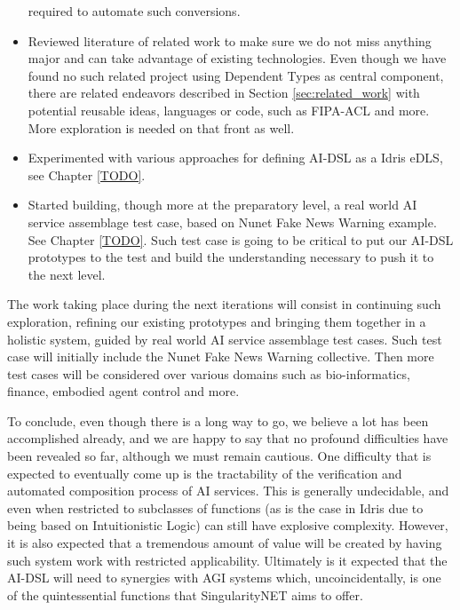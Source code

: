 \documentclass[]{report}
\begin{document}
\begin{itemize}
  required to automate such conversions.
\item Reviewed literature of related work to make sure we do not miss
  anything major and can take advantage of existing technologies.
  Even though we have found no such related project using Dependent
  Types as central component, there are related endeavors described in Section
  \ref{sec:related_work} with potential reusable ideas, languages or code,
  such as FIPA-ACL and more.  More exploration is needed on that front
  as well.
\item Experimented with various approaches for defining AI-DSL as a
  Idris eDLS, see Chapter \ref{TODO}.
\item Started building, though more at the preparatory level, a real
  world AI service assemblage test case, based on Nunet Fake News
  Warning example.  See Chapter \ref{TODO}.  Such test case is going
  to be critical to put our AI-DSL prototypes to the test and build
  the understanding necessary to push it to the next level.
\end{itemize}
The work taking place during the next iterations will consist in
continuing such exploration, refining our existing prototypes and
bringing them together in a holistic system, guided by real world AI
service assemblage test cases.  Such test case will initially include
the Nunet Fake News Warning collective.  Then more test cases will be
considered over various domains such as bio-informatics, finance,
embodied agent control and more.

To conclude, even though there is a long way to go, we believe a lot
has been accomplished already, and we are happy to say that no
profound difficulties have been revealed so far, although we must
remain cautious.  One difficulty that is expected to eventually come
up is the tractability of the verification and automated composition
process of AI services.  This is generally undecidable, and even when
restricted to subclasses of functions (as is the case in Idris due to
being based on Intuitionistic Logic) can still have explosive
complexity.  However, it is also expected that a tremendous amount of
value will be created by having such system work with restricted
applicability.  Ultimately is it expected that the AI-DSL will need to
synergies with AGI systems which, uncoincidentally, is one of the
quintessential functions that SingularityNET aims to offer.

\appendix
\end{document}
